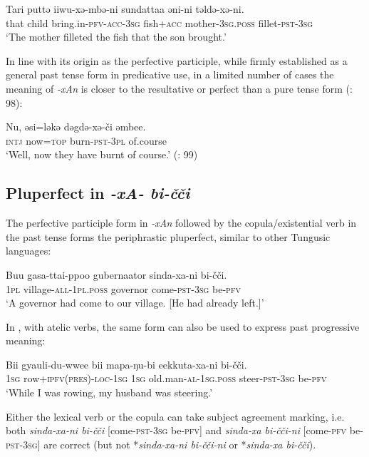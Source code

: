 \documentclass[output=paper,colorlinks,citecolor=brown]{langscibook}
\begin{document}
\ea
\label{example3.9}
\gll Tari	puttə	iiwu-xə-mbə-ni		sundattaa	əni-ni			təldə-xə-ni.\\
     	that	child	bring.in-\textsc{pfv}-\textsc{acc}-\textsc{3sg}	fish+\textsc{acc}		mother-\textsc{3sg.poss}	fillet-\textsc{pst}-\textsc{3sg}\\
\glt `The mother filleted the fish that the son brought.’
\z


In line with its origin as the perfective participle, while firmly established as a general past tense form in predicative use, in a limited number of cases the meaning of \textit{-xAn} is closer to the resultative or perfect than a pure tense form (\citealt{Yamada_2013}: 98):

\ea
\label{example3.10}
\gll Nu,		əsi=ləkə		dəgdə-xə-či		əmbee.\\
     	\textsc{intj}		now=\textsc{top}	burn-\textsc{pst}-\textsc{3pl}		of.course\\
\glt `Well, now they have burnt of course.’ (\citealt{Yamada_2013}: 99)
\z


\subsection{Pluperfect in \textit{-xA- bi-čči}}\label{Section3.3.2}

The perfective participle form in \textit{-xAn} followed by the copula/existential verb in the past tense forms the periphrastic pluperfect, similar to other Tungusic languages:

\ea
\label{example3.11}
\gll Buu	gasa-ttai-ppoo		gubernaator	sinda-xa-ni		bi-čči.\\
     	\textsc{1pl}	village-\textsc{all}-\textsc{1pl}.\textsc{poss}	governor		come-\textsc{pst}-\textsc{3sg}	be-\textsc{pfv}\\
\glt `A governor had come to our village. [He had already left.]’
\z

In , with atelic verbs, the same form can also be used to express past progressive meaning:

\ea
\label{example3.12}
\gll Bii	gyauli-du-wwee		bii	mapa-ŋu-bi			eekkuta-xa-ni		bi-čči.\\
     	\textsc{1sg}	row+\textsc{ipfv(pres)}-\textsc{loc}-\textsc{1sg}	\textsc{1sg}	old.man-\textsc{al}-\textsc{1sg.poss}	steer-\textsc{pst}-\textsc{3sg}		be-\textsc{pfv}\\
\glt `While I was rowing, my husband was steering.’
\z

Either the lexical verb or the copula can take subject agreement marking, i.e. both \textit{sinda-xa-ni bi-čči} [come-\textsc{pst-3sg} be-\textsc{pfv}] and \textit{sinda-xa bi-čči-ni} [come-\textsc{pfv} be-\textsc{pst-3sg}] are correct (but not *\textit{sinda-xa-ni bi-čči-ni} or *\textit{sinda-xa bi-čči}).
\end{document}
